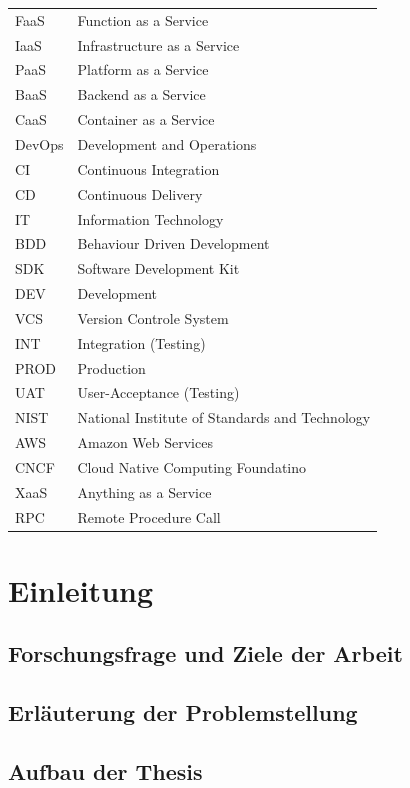\documentclass[11pt]{article}
\begin{document}
\begin{tabular}{ p{2cm} p{10cm}} 
 FaaS & Function as a Service \\ 
 IaaS & Infrastructure as a Service \\
 PaaS & Platform as a Service \\
 BaaS & Backend as a Service \\
 CaaS & Container as a Service \\  
 DevOps & Development and Operations \\  
 CI & Continuous Integration \\
 CD & Continuous Delivery \\  
 IT & Information Technology \\
 BDD & Behaviour Driven Development \\
 SDK & Software Development Kit \\
 DEV & Development \\
 VCS & Version Controle System \\
 INT & Integration (Testing) \\
 PROD & Production \\
 UAT & User-Acceptance (Testing) \\
 NIST & National Institute of Standards and Technology\\
 AWS & Amazon Web Services \\
 CNCF & Cloud Native Computing Foundatino \\
 XaaS & Anything as a Service \\
 RPC & Remote Procedure Call \\
 
\end{tabular}
\newpage
\tableofcontents
\newpage
\section{Einleitung}
\subsection{Forschungsfrage und Ziele der Arbeit}
\subsection{Erläuterung der Problemstellung}
\subsection{Aufbau der Thesis}
\end{document}
